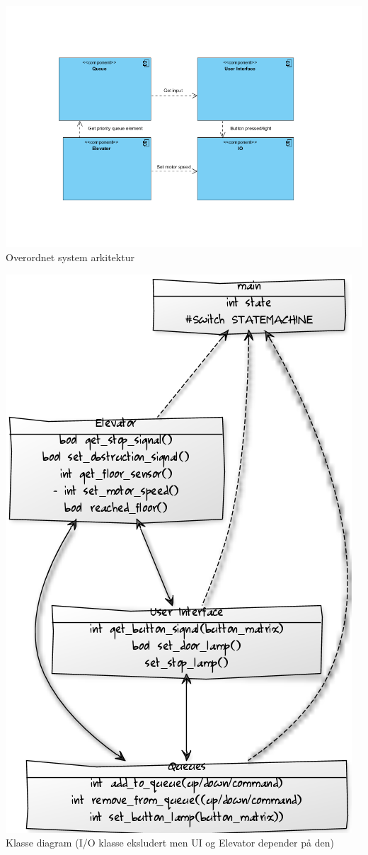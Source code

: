 \documentclass[pdftex,12pt,a4paper]{article}
\begin{document}
\begin{center}
\includegraphics[scale=0.7]{./overordnet_diagram.jpg}
\\Overordnet system arkitektur
\end{center}

\begin{center}
\includegraphics[scale=0.71]{./class_diagram.png}
\\Klasse diagram (I/O klasse eksludert men UI og Elevator depender på den)
\end{center}
\end{document}

